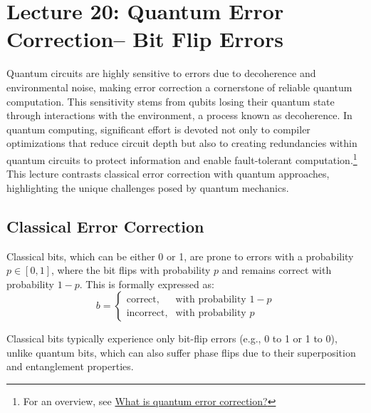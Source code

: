 \section{Lecture 20: Quantum Error Correction-- Bit Flip Errors}
\label{sec:lecture20}

Quantum circuits are highly sensitive to errors due to decoherence and
environmental noise, making error correction a cornerstone of reliable
quantum computation. This sensitivity stems from qubits losing their quantum
state through interactions with the environment, a process known as
decoherence. In quantum computing, significant effort is devoted not only to
compiler optimizations that reduce circuit depth but also to creating
redundancies within quantum circuits to protect information and enable
fault-tolerant computation.\footnote{For an overview, see
  \href{https://q-ctrl.com/topics/what-is-quantum-error-correction}{What is
quantum error correction?}} This lecture contrasts classical error correction
with quantum approaches, highlighting the unique challenges posed by quantum
mechanics.

\subsection*{Classical Error Correction}

Classical bits, which can be either 0 or 1, are prone to errors with a
probability \( p \in [0, 1] \), where the bit flips with probability \( p \)
and remains correct with probability \( 1 - p \). This is formally expressed as:
\[
  b =
  \begin{cases}
    \text{correct}, & \text{with probability } 1 - p \\
    \text{incorrect}, & \text{with probability } p
  \end{cases}
\]

Classical bits typically experience only bit-flip errors (e.g., 0 to 1 or 1
to 0), unlike quantum bits, which can also suffer phase flips due to their
superposition and entanglement properties.

